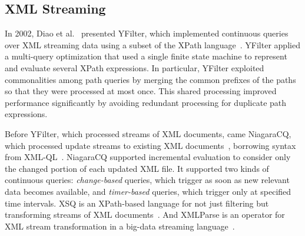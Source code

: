 \subsection{XML Streaming}\label{sec:xml} %

In 2002, Diao et al.~\cite{diao_et_al_2002} presented %
\textsf{YFilter}, which implemented continuous queries over XML
streaming data using a subset of the XPath
language~\cite{clark_derose_1999}. YFilter applied a multi-query
optimization that used a single finite state machine to represent and
evaluate several XPath expressions. In particular, YFilter exploited
commonalities among path queries by merging the common prefixes of
the paths so that they were processed at most once. This shared
processing improved performance significantly by
avoiding redundant processing for duplicate path expressions.  \iffalse To
handle value-based predicates that address contents of elements,
YFilter applied two alternative approa\-ches. The first approach
evaluates the predicates once the addressed elements are read from a
document, while the second approach postpones predicate evaluation
until the corresponding path expression has been entirely matched.\fi

Before YFilter, which processed streams of XML documents, came
\textsf{NiagaraCQ}, which processed update streams to existing XML
documents~\cite{chen_et_al_2000}, borrowing syntax from
XML-QL~\cite{deutsch1999query}.  NiagaraCQ supported incremental
evaluation to consider only the changed portion of each updated XML
file. It supported two kinds of continuous queries:
\emph{change-based} queries, which trigger as soon as new relevant
data becomes available, and \emph{timer-based} queries, which trigger
only at specified time intervals. \textsf{XSQ} is an XPath-based
language for not just filtering but transforming streams of XML
documents~\cite{peng_chawathe_2003}. And \textsf{XMLParse} is an
operator for XML stream transformation in a big-data streaming
language~\cite{mendell_et_al_2012}.
